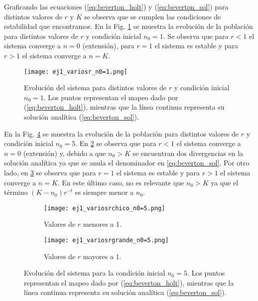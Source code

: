 \documentclass[letterpaper,12pt]{article}
\theoremstyle{plain}
\begin{document}
Graficando las ecuaciones (\ref*{eq:beverton_holt}) y (\ref*{eq:beverton_sol}) para distintos valores de $r$ y $K$ se observa que se cumplen las condiciones de estabilidad que encontramos. En la Fig. \ref*{fig:ej1_variosr_n0=1} se muestra la evolución de la población para distintos valores de $r$ y condición inicial $n_0=1$. Se observa que para $r<1$ el sistema converge a $n=0$ (extensión), para $r=1$ el sistema es estable y para $r>1$ el sistema converge a $n=K$.

\begin{figure}[h]
    \centering
    \texttt{[image: ej1\_variosr\_n0=1.png]}
    \caption{Evolución del sistema para distintos valores de $r$ y condición inicial $n_0=1$. Los puntos representan el mapeo dado por (\ref*{eq:beverton_holt}), mientras que la línea continua representa su solución analítica (\ref*{eq:beverton_sol}).} 
    \label{fig:ej1_variosr_n0=1}
\end{figure}

En la Fig. \ref*{fig:ej1_variosn0} se muestra la evolución de la población para distintos valores de $r$ y condición inicial $n_0=5$. En \ref*{fig:ej1_variosrchico_n0=5} se observa que para $r<1$ el sistema converge a $n=0$ (extensión) y, debido a que $n_0>K$ se encuentran dos divergencias en la solución analítica ya que se anula el denominador en \ref*{eq:beverton_sol}. Por otro lado, en \ref*{fig:ej1_variosrgrande_n0=5} se observa que para $r=1$ el sistema es estable y para $r>1$ el sistema converge a $n=K$. En este último caso, no es relevante que $n_0>K$ ya que el término $(K - n_0)r^{-t}$ es siempre menor a $n_0$.

\begin{figure}[h]
    \centering
    \begin{subfigure}[b]{0.49\textwidth}
        \texttt{[image: ej1\_variosrchico\_n0=5.png]}
        \caption{Valores de $r$ menores a 1.}
        \label{fig:ej1_variosrchico_n0=5}
    \end{subfigure}
    \hfill
    \begin{subfigure}[b]{0.49\textwidth}
        \texttt{[image: ej1\_variosrgrande\_n0=5.png]}
        \caption{Valores de $r$ mayores a 1.}
        \label{fig:ej1_variosrgrande_n0=5}
    \end{subfigure}
    \caption{Evolución del sistema para la condición inicial $n_0=5$. Los puntos representan el mapeo dado por (\ref*{eq:beverton_holt}), mientras que la línea continua representa su solución analítica (\ref*{eq:beverton_sol}).}
    \label{fig:ej1_variosn0}
\end{figure}
\end{document}
